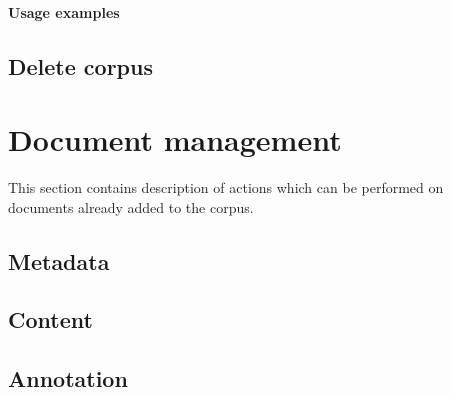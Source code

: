 \documentclass[a4paper,10pt,oneside]{scrbook}
\begin{document}
\subsubsection{Usage examples}



\section{Delete corpus}


\chapter{Document management}
This section contains description of actions which can be performed on documents already added to the corpus.

\section{Metadata}


\section{Content}


\section{Annotation}
\end{document}
